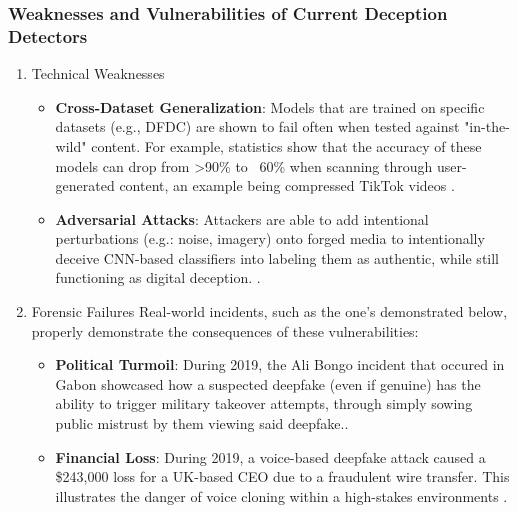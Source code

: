 \documentclass[12pt,a4paper]{article}
\begin{document}
\subsubsection{Weaknesses and Vulnerabilities of Current Deception Detectors}
\begin{enumerate}
\item Technical Weaknesses
\begin{itemize}
\item \textbf{Cross-Dataset Generalization}: Models that are trained on specific datasets (e.g., DFDC) are shown to fail often when tested against "in-the-wild" content. 
For example, statistics show that the accuracy of these models can drop from >90\% to ~60\% when scanning through user-generated content, an example being  compressed TikTok videos \cite{SINGH2025103632}.
\item \textbf{Adversarial Attacks}: Attackers are able to add intentional perturbations (e.g.: noise, imagery) onto forged media to intentionally deceive CNN-based classifiers into labeling them as authentic, while still functioning as digital deception. \cite{SINGH2025103632}.
\end{itemize}

\item Forensic Failures 
Real-world incidents, such as the one's demonstrated below, properly demonstrate the consequences of these vulnerabilities:
\begin{itemize}
\item \textbf{Political Turmoil}: During 2019, the Ali Bongo incident that occured in Gabon showcased how a suspected deepfake (even if genuine) has the ability to trigger military takeover attempts, through simply sowing public mistrust by them viewing said deepfake.\cite{SINGH2025103632}.
\item \textbf{Financial Loss}: During 2019, a voice-based deepfake attack caused a \$243,000 loss for a UK-based CEO due to a fraudulent wire transfer.
This illustrates the danger of voice cloning within a high-stakes environments \cite{SINGH2025103632}.
\end{itemize}
\end{enumerate}
\end{document}
